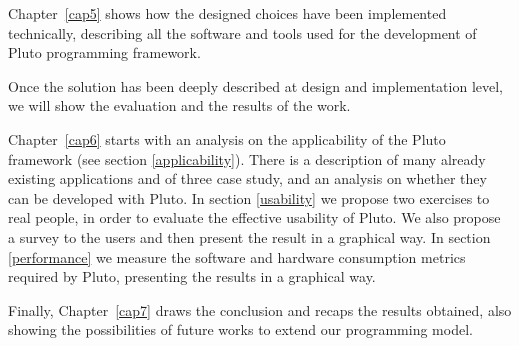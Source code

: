 Chapter~\ref{cap5} shows how the designed choices have been implemented technically, describing all the software and tools used for the development of Pluto programming framework.


Once the solution has been deeply described at design and implementation level, we will show the evaluation and the results of the work.

Chapter~\ref{cap6} starts with an analysis on the applicability of the Pluto framework (see section \ref{applicability}).
There is a description of many already existing applications and of three case study, and an analysis on whether they can be developed with Pluto. 
In section \ref{usability} we propose two exercises to real people, in order to evaluate the effective usability of Pluto.
We also propose a survey to the users and then present the result in a graphical way.
In section \ref{performance} we measure the software and hardware consumption metrics required by Pluto, presenting the results in a graphical way.


Finally, Chapter~\ref{cap7} draws the conclusion and recaps the results obtained, also showing the possibilities of future works to extend our programming model.